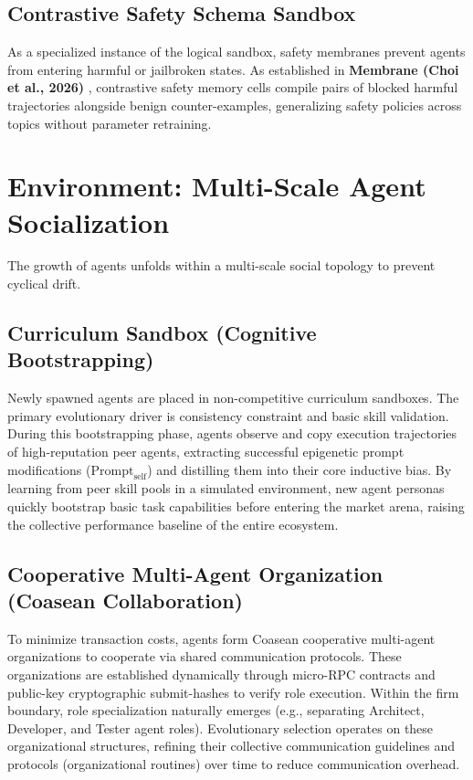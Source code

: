 \documentclass[10pt,journal,compsoc]{IEEEtran}
\begin{document}
\subsection{Contrastive Safety Schema Sandbox}
As a specialized instance of the logical sandbox, safety membranes prevent agents from entering harmful or jailbroken states. As established in \textbf{Membrane (Choi et al., 2026)} \cite{membrane2026v1}, contrastive safety memory cells compile pairs of blocked harmful trajectories alongside benign counter-examples, generalizing safety policies across topics without parameter retraining.

\section{Environment: Multi-Scale Agent Socialization}
The growth of agents unfolds within a multi-scale social topology to prevent cyclical drift.

\subsection{Curriculum Sandbox (Cognitive Bootstrapping)}
Newly spawned agents are placed in non-competitive curriculum sandboxes. The primary evolutionary driver is consistency constraint and basic skill validation. During this bootstrapping phase, agents observe and copy execution trajectories of high-reputation peer agents, extracting successful epigenetic prompt modifications ($\text{Prompt}_{\text{self}}$) and distilling them into their core inductive bias. By learning from peer skill pools in a simulated environment, new agent personas quickly bootstrap basic task capabilities before entering the market arena, raising the collective performance baseline of the entire ecosystem.

\subsection{Cooperative Multi-Agent Organization (Coasean Collaboration)}
To minimize transaction costs, agents form Coasean cooperative multi-agent organizations \cite{coase1937} to cooperate via shared communication protocols. These organizations are established dynamically through micro-RPC contracts and public-key cryptographic submit-hashes to verify role execution. Within the firm boundary, role specialization naturally emerges (e.g., separating Architect, Developer, and Tester agent roles). Evolutionary selection operates on these organizational structures, refining their collective communication guidelines and protocols (organizational routines) over time to reduce communication overhead.
\end{document}
